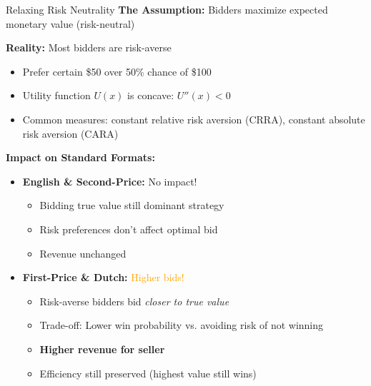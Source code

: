 \documentclass[xcolor={x11names}]{beamer}
\begin{document}
\begin{frame}{Relaxing Risk Neutrality}
\textbf{The Assumption:} Bidders maximize expected monetary value (risk-neutral)


\textbf{Reality:} Most bidders are risk-averse
\begin{itemize}
  \item Prefer certain \$50 over 50\% chance of \$100
  \item Utility function $U(x)$ is concave: $U''(x) < 0$
  \item Common measures: constant relative risk aversion (CRRA), constant absolute risk aversion (CARA)
\end{itemize}

\textbf{Impact on Standard Formats:}
\begin{itemize}
  \item \textbf{English \& Second-Price:} \textcolor{green!70!black}{No impact!}
  \begin{itemize}
    \item Bidding true value still dominant strategy
    \item Risk preferences don't affect optimal bid
    \item Revenue unchanged
  \end{itemize}
  
  \item \textbf{First-Price \& Dutch:} \textcolor{orange}{Higher bids!}
  \begin{itemize}
    \item Risk-averse bidders bid \textit{closer to true value}
    \item Trade-off: Lower win probability vs. avoiding risk of not winning
    \item \textbf{Higher revenue for seller}
    \item Efficiency still preserved (highest value still wins)
  \end{itemize}
\end{itemize}
\end{frame}
\end{document}
